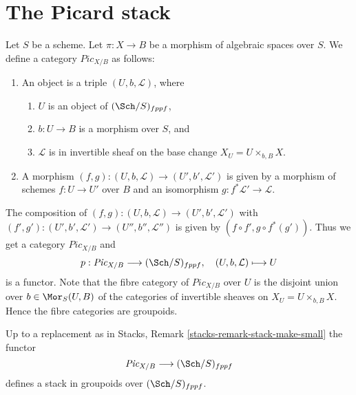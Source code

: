 \section{The Picard stack}
\label{section-picard-stack}

\noindent
Let $S$ be a scheme.
Let $\pi : X \to B$ be a morphism of algebraic spaces over $S$.
We define a category $\textit{Pic}_{X/B}$ as follows:
\begin{enumerate}
\item An object is a triple $(U, b, \mathcal{L})$, where
\begin{enumerate}
\item $U$ is an object of $(\Sch/S)_{fppf}$,
\item $b : U \to B$ is a morphism over $S$, and
\item $\mathcal{L}$ is in invertible sheaf on the base change
$X_U = U \times_{b, B} X$.
\end{enumerate}
\item A morphism $(f, g) : (U, b, \mathcal{L}) \to (U', b', \mathcal{L}')$
is given by a morphism of schemes $f : U \to U'$ over $B$ and an
isomorphism $g : f^*\mathcal{L}' \to \mathcal{L}$.
\end{enumerate}
The composition of
$(f, g) : (U, b, \mathcal{L}) \to (U', b', \mathcal{L}')$
with
$(f', g') : (U', b', \mathcal{L}') \to (U'', b'', \mathcal{L}'')$
is given by $(f \circ f', g \circ f^*(g'))$.
Thus we get a category $\textit{Pic}_{X/B}$ and
$$
p : \textit{Pic}_{X/B} \longrightarrow (\Sch/S)_{fppf},
\quad
(U, b, \mathcal{L}) \longmapsto U
$$
is a functor. Note that the fibre category of $\textit{Pic}_{X/B}$ over $U$
is the disjoint union over $b \in \Mor_S(U, B)$ of the categories
of invertible sheaves on $X_U = U \times_{b, B} X$. Hence the fibre
categories are groupoids.

\begin{lemma}
\label{lemma-picard-stack}
Up to a replacement as in
Stacks, Remark \ref{stacks-remark-stack-make-small}
the functor
$$
\textit{Pic}_{X/B} \longrightarrow (\Sch/S)_{fppf}
$$
defines a stack in groupoids over $(\Sch/S)_{fppf}$.
\end{lemma}

